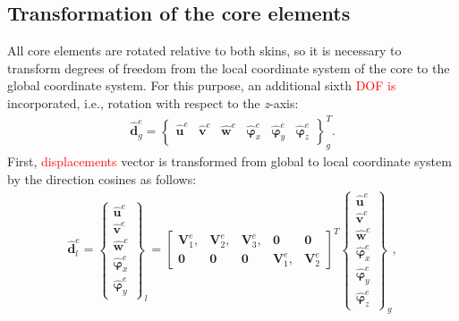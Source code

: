 \documentclass[sensors,article,submit,moreauthors,pdftex]{Definitions/mdpi}
\begin{document}
\subsection{Transformation of the core elements}
\label{sec:transformation}
All core elements are rotated relative to both skins, so it is necessary to transform degrees of freedom from the local coordinate system of the core to the global coordinate system.
For this purpose, an additional sixth \textcolor{red}{DOF is} incorporated, i.e., rotation with respect to the \textit{z}-axis:
\begin{eqnarray}
	\widehat{\textbf{d}}^e_g = \left \{\begin{array}{cccccc}
		\widehat{\textbf{u}}^e & \widehat{\textbf{v}}^e &
		\widehat{\textbf{w}}^e & \widehat{\boldsymbol{\varphi}}_x^e &
		\widehat{\boldsymbol{\varphi}}_y^e & \widehat{\boldsymbol{\varphi}}_z^e
	\end{array}\right \}^T_g.
	\label{eq:d6}
\end{eqnarray}
First, \textcolor{red}{displacements} vector is transformed from global to local coordinate system by the direction cosines as follows:
\begin{eqnarray}
	\widehat{\textbf{d}}^e_l = \left \{\begin{array}{c}
		\widehat{\textbf{u}}^e \\ \widehat{\textbf{v}}^e \\
		\widehat{\textbf{w}}^e \\ \widehat{\boldsymbol{\varphi}}_x^e \\
		\widehat{\boldsymbol{\varphi}}_y^e
	\end{array}\right \}_l = 
	\left [\begin{array}{ccccc}
		\textbf{V}^e_1, & \textbf{V}^e_2, & \textbf{V}^e_3, & \textbf{0} & \textbf{0} \\
		\textbf{0} & \textbf{0} & \textbf{0} & \textbf{V}^e_1, & \textbf{V}^e_2
	\end{array}\right ]^T
	\left \{\begin{array}{c}
	\widehat{\textbf{u}}^e \\ \widehat{\textbf{v}}^e \\
	\widehat{\textbf{w}}^e \\ \widehat{\boldsymbol{\varphi}}_x^e \\
	\widehat{\boldsymbol{\varphi}}_y^e\\
	\widehat{\boldsymbol{\varphi}}_z^e
\end{array}\right \}_g,
	\label{eq:d_local}
\end{eqnarray}
\end{document}
